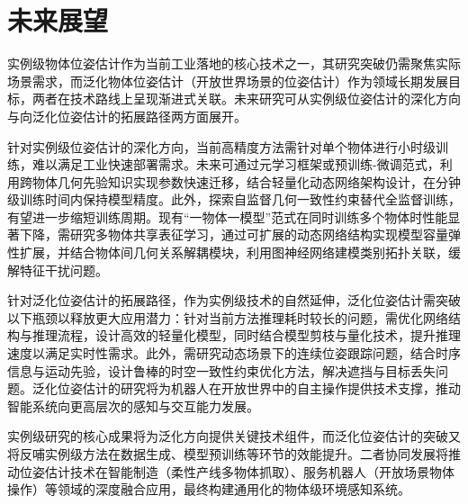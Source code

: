 \section{未来展望}
\par 实例级物体位姿估计作为当前工业落地的核心技术之一，其研究突破仍需聚焦实际场景需求，而泛化物体位姿估计（开放世界场景的位姿估计）作为领域长期发展目标，两者在技术路线上呈现渐进式关联。未来研究可从实例级位姿估计的深化方向与向泛化位姿估计的拓展路径两方面展开。
\par 针对实例级位姿估计的深化方向，当前高精度方法需针对单个物体进行小时级训练，难以满足工业快速部署需求。未来可通过元学习框架或预训练-微调范式，利用跨物体几何先验知识实现参数快速迁移，结合轻量化动态网络架构设计，在分钟级训练时间内保持模型精度。此外，探索自监督几何一致性约束替代全监督训练，有望进一步缩短训练周期。现有“一物体一模型”范式在同时训练多个物体时性能显著下降，需研究多物体共享表征学习，通过可扩展的动态网络结构实现模型容量弹性扩展，并结合物体间几何关系解耦模块，利用图神经网络建模类别拓扑关联，缓解特征干扰问题。
\par 针对泛化位姿估计的拓展路径，作为实例级技术的自然延伸，泛化位姿估计需突破以下瓶颈以释放更大应用潜力：针对当前方法推理耗时较长的问题，需优化网络结构与推理流程，设计高效的轻量化模型，同时结合模型剪枝与量化技术，提升推理速度以满足实时性需求。此外，需研究动态场景下的连续位姿跟踪问题，结合时序信息与运动先验，设计鲁棒的时空一致性约束优化方法，解决遮挡与目标丢失问题。泛化位姿估计的研究将为机器人在开放世界中的自主操作提供技术支撑，推动智能系统向更高层次的感知与交互能力发展。
\par 实例级研究的核心成果将为泛化方向提供关键技术组件，而泛化位姿估计的突破又将反哺实例级方法在数据生成、模型预训练等环节的效能提升。二者协同发展将推动位姿估计技术在智能制造（柔性产线多物体抓取）、服务机器人（开放场景物体操作）等领域的深度融合应用，最终构建通用化的物体级环境感知系统。

